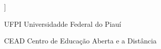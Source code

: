 ]\begin{siglas}
  \item[UFPI] Universidadde Federal do Piauí
  \item[CEAD] Centro de Educação Aberta e a Distância
\end{siglas}